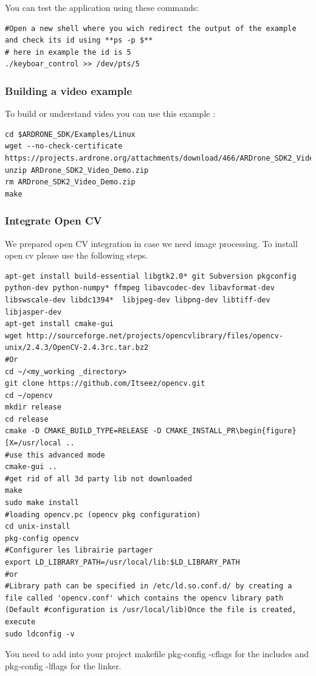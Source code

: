 You can test the application using these commands:
\begin{lstlisting}
#Open a new shell where you wich redirect the output of the example and check its id using **ps -p $**
# here in example the id is 5
./keyboar_control >> /dev/pts/5
\end{lstlisting}

\subsubsection{Building a video example}
To build or understand video you can use this example :
\begin{lstlisting}
cd $ARDRONE_SDK/Examples/Linux
wget --no-check-certificate https://projects.ardrone.org/attachments/download/466/ARDrone_SDK2_Video_Demo.zip
unzip ARDrone_SDK2_Video_Demo.zip
rm ARDrone_SDK2_Video_Demo.zip
make
\end{lstlisting}
\subsubsection{Integrate Open CV} 
We prepared open CV integration in case we need image processing.
To install open cv please use the following steps.
\begin{lstlisting}
apt-get install build-essential libgtk2.0* git Subversion pkgconfig python-dev python-numpy* ffmpeg libavcodec-dev libavformat-dev libswscale-dev libdc1394*  libjpeg-dev libpng-dev libtiff-dev libjasper-dev
apt-get install cmake-gui
wget http://sourceforge.net/projects/opencvlibrary/files/opencv-unix/2.4.3/OpenCV-2.4.3rc.tar.bz2
#Or 
cd ~/<my_working _directory>
git clone https://github.com/Itseez/opencv.git
cd ~/opencv
mkdir release
cd release
cmake -D CMAKE_BUILD_TYPE=RELEASE -D CMAKE_INSTALL_PR\begin{figure}[X=/usr/local ..
#use this advanced mode
cmake-gui ..
#get rid of all 3d party lib not downloaded
make
sudo make install
#loading opencv.pc (opencv pkg configuration)
cd unix-install
pkg-config opencv
#Configurer les librairie partager
export LD_LIBRARY_PATH=/usr/local/lib:$LD_LIBRARY_PATH
#or
#Library path can be specified in /etc/ld.so.conf.d/ by creating a file called 'opencv.conf' which contains the opencv library path (Default #configuration is /usr/local/lib)Once the file is created, execute
sudo ldconfig -v 
\end{lstlisting}

You need to add into your project makefile pkg-config -cflags for the includes and pkg-config -lflags for the linker.

